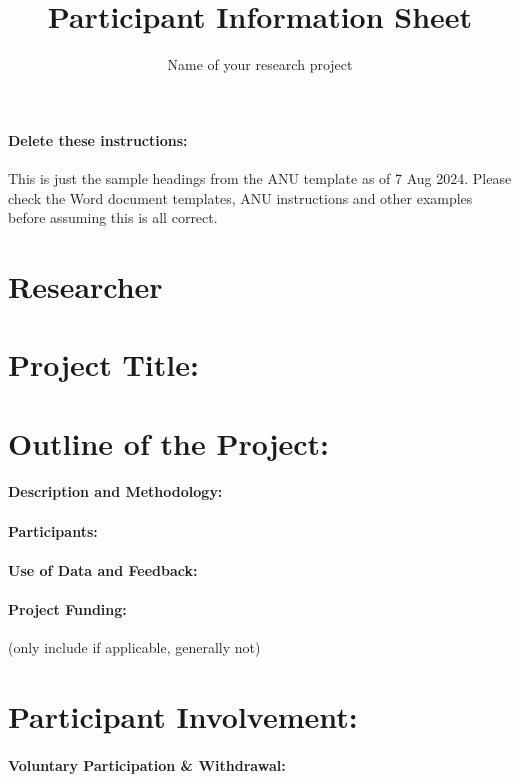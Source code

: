 \documentclass[11pt, a4paper, oneside]{article}
\title{Participant Information Sheet}
\subtitle{Name of your research project}
\begin{document}
\paragraph{Delete these instructions:} This is just the sample headings from the ANU template as of 7 Aug 2024. Please check the Word document templates, ANU instructions and other examples before assuming this is all correct.

\section{Researcher}



\section{Project Title:}



\section{Outline of the Project:}

\paragraph{Description and Methodology:}

\paragraph{Participants:}

\paragraph{Use of Data and Feedback:}

\paragraph{Project Funding:} (only include if applicable, generally not)



\section{Participant Involvement:}

\paragraph{Voluntary Participation \& Withdrawal:}
\end{document}
